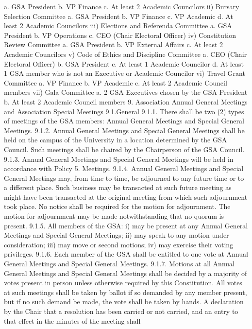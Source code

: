 \documentclass{article}
\begin{document}
a. GSA President 
b. VP Finance 
c. At least 2 Academic Councilors 
ii) Bursary Selection Committee 
a. GSA President 
b. VP Finance 
c. VP Academic 
d. At least 2 Academic Councilors 
iii) Elections and Referenda Committee 
a. GSA President 
b. VP Operations 
c. CEO (Chair Electoral Officer) 
iv) Constitution Review Committee 
a. GSA President 
b. VP External Affairs 
c. At least 2 Academic Councilors 
v) Code of Ethics and Discipline Committee 
a. CEO (Chair Electoral Officer) 
b. GSA President 
c. At least 1 Academic Councilor 
d. At least 1 GSA member who is not an Executive or Academic 
 Councilor 
vi) Travel Grant Committee 
a. VP Finance 
b. VP Academic 
c. At least 2 Academic Council members 
vii) Gala Committee 
a. 2 GSA Executives chosen by the GSA President 
b. At least 2 Academic Council members 
9. Association Annual General Meetings and Association Special  Meetings 
9.1.General 
9.1.1. There shall be two (2) types of meetings of the GSA members: Annual 
General Meetings and Special General Meetings. 
9.1.2. Annual General Meetings and Special General Meetings shall be held 
on the campus of the University in a location determined by the GSA 
Council. Such meetings shall be chaired by the Chairperson of the GSA Council. 
9.1.3. Annual General Meetings and Special General Meetings will be held 
in accordance with Policy 5. Meetings. 
9.1.4. Annual General Meetings and Special General Meetings may, from 
time to time, be adjourned to any future time or to a different place. 
Such business may be transacted at such future meeting as might have 
been transacted at the original meeting from which such adjournment 
took place. No notice shall be required for the motion for adjournment. 
The motion for adjournment may be made notwithstanding that no 
quorum is present. 
9.1.5. All members of the GSA: 
i) may be present at any Annual General Meetings and Special General 
Meetings; 
ii) may speak to any motion under consideration; 
iii) may move or second motions; 
iv) may exercise their voting privileges. 
9.1.6. Each member of the GSA shall be entitled to one vote at Annual 
General Meetings and Special General Meetings. 
9.1.7. Motions at all Annual General Meetings and Special General Meetings 
shall be decided by a majority of votes present in person unless 
otherwise required by this Constitution. All votes at such meetings 
shall be taken by ballot if so demanded by any member present, but if 
no such demand be made, the vote shall be taken by hands. A 
declaration by the Chair that a resolution has been carried or not 
carried, and an entry to that effect in the minutes of the meeting shall 
\end{document}
